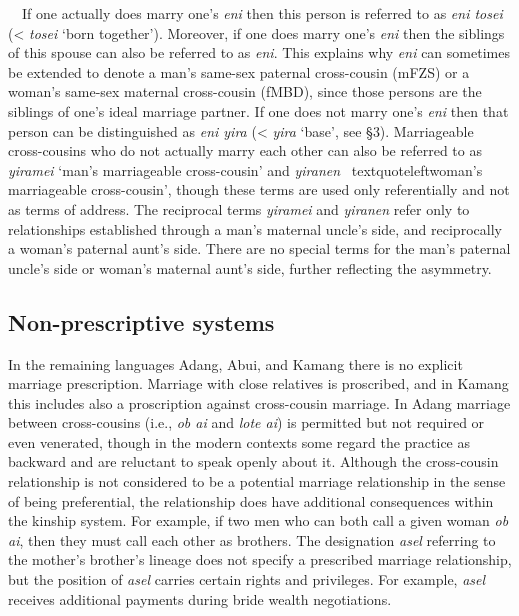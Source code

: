 \ \ If one actually does marry one{\textquoteright}s \textit{eni }then this person is referred to as \textit{eni tosei} ({\textless} \textit{tosei }{\textquoteleft}born together{\textquoteright}). Moreover, if one does marry one{\textquoteright}s \textit{eni} then the siblings of this spouse can also be referred to as \textit{eni}. This explains why \textit{eni} can sometimes be extended to denote a man{\textquoteright}s same-sex paternal cross-cousin (mFZS) or a woman{\textquoteright}s same-sex maternal cross-cousin (fMBD), since those persons are the siblings of one{\textquoteright}s ideal marriage partner. If one does not marry one{\textquoteright}s \textit{eni }then that person can be distinguished as \textit{eni yira} ({\textless} \textit{yira }{\textquoteleft}base{\textquoteright}, see {\S}3). Marriageable cross-cousins who do not actually marry each other can also be referred to as \textit{yiramei} {\textquoteleft}man{\textquoteright}s marriageable cross-cousin{\textquoteright} and \textit{yiranen} {\
textquoteleft}woman{\textquoteright}s marriageable cross-cousin{\textquoteright}, though these terms are used only referentially and not as terms of address. The reciprocal terms \textit{yiramei }and \textit{yiranen }refer only to relationships established through a man{\textquoteright}s maternal uncle{\textquoteright}s side, and reciprocally a woman{\textquoteright}s paternal aunt{\textquoteright}s side. There are no special terms for the man{\textquoteright}s paternal uncle{\textquoteright}s side or woman{\textquoteright}s maternal aunt{\textquoteright}s side, further reflecting the asymmetry. 

\subsection[Non{}-prescriptive systems]{Non-prescriptive systems}
\hypertarget{RefHeading78041871885726}{}In the remaining languages Adang, Abui, and Kamang there is no explicit marriage prescription. Marriage with close relatives is proscribed, and in Kamang this includes also a proscription against cross-cousin marriage. In Adang marriage between cross-cousins (i.e., \textit{ob ai }and \textit{lote ai}) is permitted but not required or even venerated, though in the modern contexts some regard the practice as backward and are reluctant to speak openly about it. Although the cross-cousin relationship is not considered to be a potential marriage relationship in the sense of being preferential, the relationship does have additional consequences within the kinship system. For example, if two men who can both call a given woman \textit{ob ai}, then they must call each other as brothers. The designation \textit{asel} referring to the mother{\textquoteright}s brother{\textquoteright}s lineage does not specify a prescribed marriage relationship, but the position of \textit{asel} 
carries certain rights and privileges. For example, \textit{asel} receives additional payments during bride wealth negotiations. 

